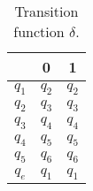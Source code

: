 \documentclass[a4paper, 12pt]{article}
\begin{document}
\begin{table}[H]
\centering
\begin{tabular}{@{}ccc@{}}
\toprule
      & 0     & 1     \\ \midrule
$q_1$ & $q_2$ & $q_2$ \\ \midrule
$q_2$ & $q_3$ & $q_3$ \\ \midrule
$q_3$ & $q_4$ & $q_4$ \\ \midrule
$q_4$ & $q_5$ & $q_5$ \\ \midrule
$q_5$ & $q_6$ & $q_6$ \\ \midrule
$q_e$ & $q_1$ & $q_1$ \\ \midrule
\end{tabular}
\caption{Transition function $\delta$.}
\label{tab:delta_3}
\end{table}
\end{document}
